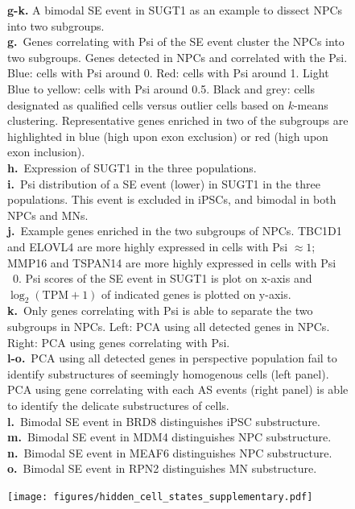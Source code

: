 \begin{figure}[h]
{\textbf{g-k.} A bimodal SE event in SUGT1 as an example to dissect NPCs into two subgroups.\\
\textbf{g.}~Genes correlating with Psi of the SE event cluster the NPCs into two subgroups. Genes detected in NPCs and correlated with the Psi. Blue: cells with Psi around 0. Red: cells with Psi around 1. Light Blue to yellow: cells with Psi around 0.5. Black and grey: cells designated as qualified cells versus outlier cells based on $k$-means clustering. Representative genes enriched in two of the subgroups are highlighted in blue (high upon exon exclusion) or red (high upon exon inclusion). \\
\textbf{h.}~Expression of SUGT1 in the three populations.\\
\textbf{i.}~Psi distribution of a SE event (lower) in SUGT1 in the three populations. This event is excluded in iPSCs, and bimodal in both NPCs and MNs.\\
\textbf{j.}~Example genes enriched in the two subgroups of NPCs. TBC1D1 and ELOVL4 are more highly expressed in cells with Psi $\approx 1$; MMP16 and TSPAN14 are more highly expressed in cells with Psi ~0. Psi scores of the SE event in SUGT1 is plot on x-axis and $\log_2(\mathrm{TPM}+1)$ of indicated genes is plotted on y-axis.\\
\textbf{k.}~Only genes correlating with Psi is able to separate the two subgroups in NPCs. Left: PCA using all detected genes in NPCs. Right: PCA using genes correlating with Psi.\\
\textbf{l-o.}~PCA using all detected genes in perspective population fail to identify substructures of seemingly homogenous cells (left panel). PCA using gene correlating with each AS events (right panel) is able to identify the delicate substructures of cells.\\
\textbf{l.}~Bimodal SE event in BRD8 distinguishes iPSC substructure.\\
\textbf{m.}~Bimodal SE event in MDM4 distinguishes NPC substructure.\\
\textbf{n.}~Bimodal SE event in MEAF6 distinguishes NPC substructure.\\
\textbf{o.}~Bimodal SE event in RPN2 distinguishes MN substructure.\\
}
\label{fig:hidden_cell_states_supplementary}

\end{figure}
\clearpage
\begin{figure}[h]
\ContinuedFloat
\captionsetup{labelformat=empty}
\centering
\texttt{[image: figures/hidden\_cell\_states\_supplementary.pdf]}
\end{figure}
\clearpage


